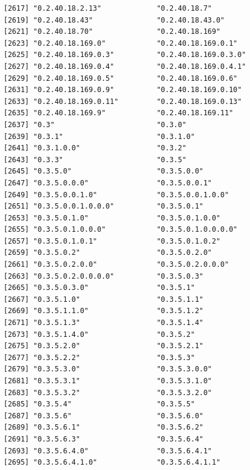 \documentclass[
  letterpaper,
  DIV=11,
  numbers=noendperiod]{scrreprt}
\begin{document}
\begin{verbatim}
[2617] "0.2.40.18.2.13"             "0.2.40.18.7"               
[2619] "0.2.40.18.43"               "0.2.40.18.43.0"            
[2621] "0.2.40.18.70"               "0.2.40.18.169"             
[2623] "0.2.40.18.169.0"            "0.2.40.18.169.0.1"         
[2625] "0.2.40.18.169.0.3"          "0.2.40.18.169.0.3.0"       
[2627] "0.2.40.18.169.0.4"          "0.2.40.18.169.0.4.1"       
[2629] "0.2.40.18.169.0.5"          "0.2.40.18.169.0.6"         
[2631] "0.2.40.18.169.0.9"          "0.2.40.18.169.0.10"        
[2633] "0.2.40.18.169.0.11"         "0.2.40.18.169.0.13"        
[2635] "0.2.40.18.169.9"            "0.2.40.18.169.11"          
[2637] "0.3"                        "0.3.0"                     
[2639] "0.3.1"                      "0.3.1.0"                   
[2641] "0.3.1.0.0"                  "0.3.2"                     
[2643] "0.3.3"                      "0.3.5"                     
[2645] "0.3.5.0"                    "0.3.5.0.0"                 
[2647] "0.3.5.0.0.0"                "0.3.5.0.0.1"               
[2649] "0.3.5.0.0.1.0"              "0.3.5.0.0.1.0.0"           
[2651] "0.3.5.0.0.1.0.0.0"          "0.3.5.0.1"                 
[2653] "0.3.5.0.1.0"                "0.3.5.0.1.0.0"             
[2655] "0.3.5.0.1.0.0.0"            "0.3.5.0.1.0.0.0.0"         
[2657] "0.3.5.0.1.0.1"              "0.3.5.0.1.0.2"             
[2659] "0.3.5.0.2"                  "0.3.5.0.2.0"               
[2661] "0.3.5.0.2.0.0"              "0.3.5.0.2.0.0.0"           
[2663] "0.3.5.0.2.0.0.0.0"          "0.3.5.0.3"                 
[2665] "0.3.5.0.3.0"                "0.3.5.1"                   
[2667] "0.3.5.1.0"                  "0.3.5.1.1"                 
[2669] "0.3.5.1.1.0"                "0.3.5.1.2"                 
[2671] "0.3.5.1.3"                  "0.3.5.1.4"                 
[2673] "0.3.5.1.4.0"                "0.3.5.2"                   
[2675] "0.3.5.2.0"                  "0.3.5.2.1"                 
[2677] "0.3.5.2.2"                  "0.3.5.3"                   
[2679] "0.3.5.3.0"                  "0.3.5.3.0.0"               
[2681] "0.3.5.3.1"                  "0.3.5.3.1.0"               
[2683] "0.3.5.3.2"                  "0.3.5.3.2.0"               
[2685] "0.3.5.4"                    "0.3.5.5"                   
[2687] "0.3.5.6"                    "0.3.5.6.0"                 
[2689] "0.3.5.6.1"                  "0.3.5.6.2"                 
[2691] "0.3.5.6.3"                  "0.3.5.6.4"                 
[2693] "0.3.5.6.4.0"                "0.3.5.6.4.1"               
[2695] "0.3.5.6.4.1.0"              "0.3.5.6.4.1.1"             

\end{verbatim}
\end{document}
